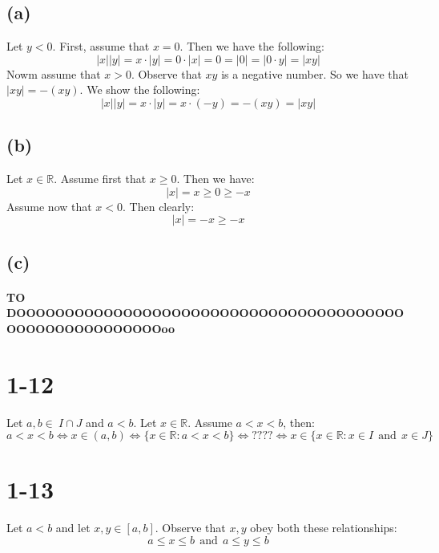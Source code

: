 \documentclass{article}
\begin{document}
\subsection*{(a)}

Let \(y < 0\). First, assume that \(x = 0\). Then we have the following:
\begin{equation*}
    |x||y| = x \cdot |y| = 0 \cdot |x| = 0 = |0| = |0 \cdot y| = |xy|
\end{equation*}
Nowm assume that \(x > 0\). Observe that \(xy\) is a negative number. So we have that \(|xy| = -(xy)\). We show the following:
\begin{equation*}
    |x||y| = x \cdot |y| = x \cdot (-y) = -(xy) = |xy|
\end{equation*}

\subsection*{(b)}

Let \(x \in \mathbb{R}\). Assume first that \(x \geq 0\). Then we have:
\begin{equation*}
    |x| = x \geq 0 \geq -x
\end{equation*}
Assume now that \(x < 0\). Then clearly:
\begin{equation*}
    |x| = -x  \geq -x 
\end{equation*}

\subsection*{(c)}
\paragraph*{TO DOOOOOOOOOOOOOOOOOOOOOOOOOOOOOOOOOOOOOOOOOOOOOOOOOOOOOOOOoo}

\section*{1-12}
Let \(a, b \in \ I \cap J\) and \(a < b\). Let \(x \in \mathbb{R}\). Assume \(a < x < b\), then:
\begin{equation*}
    a < x < b \iff x \in (a, b) \iff \{x \in \mathbb{R} : a < x < b\} \iff \mbox{????} \iff x \in \{x \in \mathbb{R} : x \in I \ \ \mbox{and} \ \ x \in J\}
\end{equation*}

\section*{1-13}
Let \(a < b\) and let \(x, y \in [a, b]\). Observe that \(x, y\) obey both these relationships:
\begin{equation*}
    a \leq x \leq b \ \ \mbox{and} \ \ a \leq y \leq b
\end{equation*}
\end{document}
